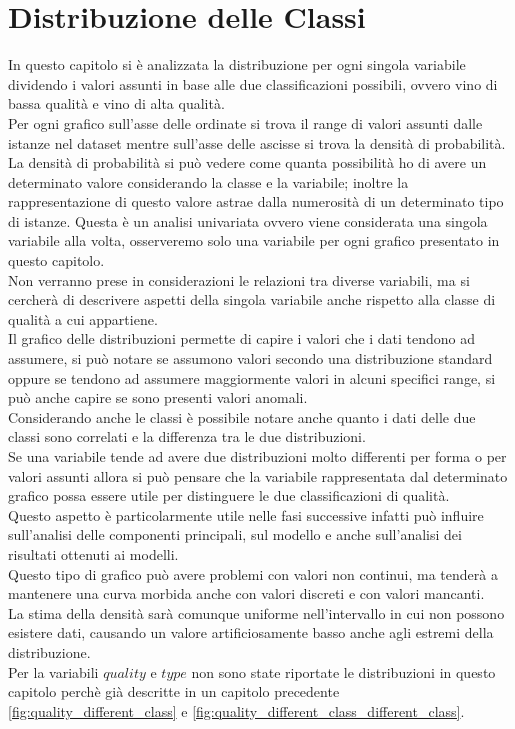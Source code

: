\section{Distribuzione delle Classi}
In questo capitolo si è analizzata la distribuzione per ogni singola variabile dividendo i valori assunti in base alle due classificazioni possibili, ovvero vino di bassa qualità e vino di alta qualità.\\
Per ogni grafico sull'asse delle ordinate si trova il range di valori assunti dalle istanze nel dataset mentre sull'asse delle ascisse si trova la densità di probabilità.\\
La densità di probabilità si può vedere come quanta possibilità ho di avere un determinato valore considerando la classe e la variabile; inoltre la rappresentazione di questo valore astrae dalla numerosità di un determinato tipo di istanze.
Questa è un analisi univariata ovvero viene considerata una singola variabile alla volta, osserveremo solo una variabile per ogni grafico presentato in questo capitolo.\\
Non verranno prese in considerazioni le relazioni tra diverse variabili, ma si cercherà di descrivere aspetti della singola variabile anche rispetto alla classe di qualità a cui appartiene.\\
Il grafico delle distribuzioni permette di capire i valori che i dati tendono ad assumere, si può notare se assumono valori secondo una distribuzione standard oppure se tendono ad assumere maggiormente valori in alcuni specifici range, si può anche capire se sono presenti valori anomali.\\
Considerando anche le classi è possibile notare anche quanto i dati delle due classi sono correlati e la differenza tra le due distribuzioni.\\
Se una variabile tende ad avere due distribuzioni molto differenti per forma o per valori assunti allora si può pensare che la variabile rappresentata dal determinato grafico possa essere utile per distinguere le due classificazioni di qualità.\\
Questo aspetto è particolarmente utile nelle fasi successive infatti può influire sull'analisi delle componenti principali, sul modello e anche sull'analisi dei risultati ottenuti ai modelli.\\
Questo tipo di grafico può avere problemi con valori non continui, ma tenderà a mantenere una curva morbida anche con valori discreti e con valori mancanti.\\
La stima della densità sarà comunque uniforme nell'intervallo in cui non possono esistere dati, causando un valore artificiosamente basso anche agli estremi della distribuzione.\\
Per la variabili $quality$ e $type$ non sono state riportate le distribuzioni in questo capitolo perchè già descritte in un capitolo precedente \ref{fig:quality_different_class} e \ref{fig:quality_different_class_different_class}.

